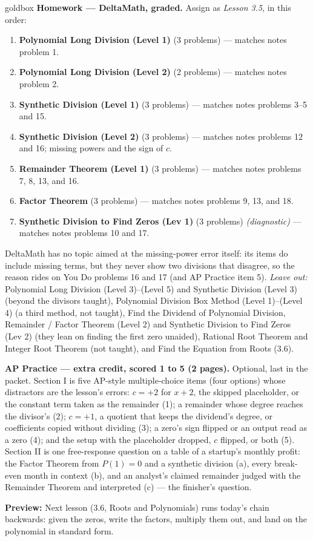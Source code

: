 \documentclass[10pt]{article}
\begin{document}
\begin{skillbox}{goldbox}
\textbf{Homework --- DeltaMath, graded.} Assign as \textit{Lesson 3.5}, in this order:
\begin{enumerate}[itemsep=1pt,topsep=2pt]
  \item \textbf{Polynomial Long Division (Level 1)} (3 problems) --- matches notes problem 1.
  \item \textbf{Polynomial Long Division (Level 2)} (2 problems) --- matches notes problem 2.
  \item \textbf{Synthetic Division (Level 1)} (3 problems) --- matches notes problems 3--5
        and 15.
  \item \textbf{Synthetic Division (Level 2)} (3 problems) --- matches notes problems 12 and
        16; missing powers and the sign of $c$.
  \item \textbf{Remainder Theorem (Level 1)} (3 problems) --- matches notes problems 7, 8,
        13, and 16.
  \item \textbf{Factor Theorem} (3 problems) --- matches notes problems 9, 13, and 18.
  \item \textbf{Synthetic Division to Find Zeros (Lev 1)} (3 problems) \textit{(diagnostic)}
        --- matches notes problems 10 and 17.
\end{enumerate}
DeltaMath has no topic aimed at the missing-power error itself: its items do include missing
terms, but they never show two divisions that disagree, so the reason rides on You Do problems
16 and 17 (and AP Practice item 5).
\textit{Leave out:} Polynomial Long Division (Level 3)--(Level 5) and Synthetic Division
(Level 3) (beyond the divisors taught), Polynomial Division Box Method (Level 1)--(Level 4) (a
third method, not taught), Find the Dividend of Polynomial Division, Remainder / Factor
Theorem (Level 2) and Synthetic Division to Find Zeros (Lev 2) (they lean on finding the first
zero unaided), Rational Root Theorem and Integer Root Theorem (not taught), and Find the
Equation from Roots (3.6).

\textbf{AP Practice --- extra credit, scored 1 to 5 (2 pages).} Optional, last in the packet.
Section I is five AP-style multiple-choice items (four options) whose distractors are the
lesson's errors: $c = +2$ for $x + 2$, the skipped placeholder, or the constant term taken as
the remainder (1); a remainder whose degree reaches the divisor's (2); $c = +1$, a quotient that
keeps the dividend's degree, or coefficients copied without dividing (3); a zero's sign flipped
or an output read as a zero (4); and the setup with the placeholder dropped, $c$ flipped, or
both (5). Section II is one free-response question on a table of a startup's monthly profit:
the Factor Theorem from $P(1) = 0$ and a synthetic division (a), every break-even month in
context (b), and an analyst's claimed remainder judged with the Remainder Theorem and
interpreted (c) --- the finisher's question.

\textbf{Preview:} Next lesson (3.6, Roots and Polynomials) runs today's chain backwards: given
the zeros, write the factors, multiply them out, and land on the polynomial in standard form.
\end{skillbox}
\end{document}
